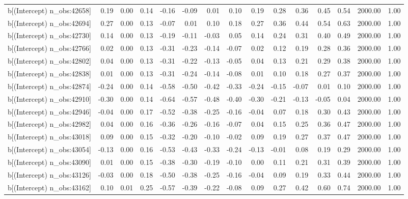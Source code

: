 \begin{table}[ht]
\begin{tabular}{rrrrrrrrrrrrrrr}
  b[(Intercept) n\_obs:42658] & 0.19 & 0.00 & 0.14 & -0.16 & -0.09 & 0.01 & 0.10 & 0.19 & 0.28 & 0.36 & 0.45 & 0.54 & 2000.00 & 1.00 \\ 
  b[(Intercept) n\_obs:42694] & 0.27 & 0.00 & 0.13 & -0.07 & 0.01 & 0.10 & 0.18 & 0.27 & 0.36 & 0.44 & 0.54 & 0.63 & 2000.00 & 1.00 \\ 
  b[(Intercept) n\_obs:42730] & 0.14 & 0.00 & 0.13 & -0.19 & -0.11 & -0.03 & 0.05 & 0.14 & 0.24 & 0.31 & 0.40 & 0.49 & 2000.00 & 1.00 \\ 
  b[(Intercept) n\_obs:42766] & 0.02 & 0.00 & 0.13 & -0.31 & -0.23 & -0.14 & -0.07 & 0.02 & 0.12 & 0.19 & 0.28 & 0.36 & 2000.00 & 1.00 \\ 
  b[(Intercept) n\_obs:42802] & 0.04 & 0.00 & 0.13 & -0.31 & -0.22 & -0.13 & -0.05 & 0.04 & 0.13 & 0.21 & 0.29 & 0.38 & 2000.00 & 1.00 \\ 
  b[(Intercept) n\_obs:42838] & 0.01 & 0.00 & 0.13 & -0.31 & -0.24 & -0.14 & -0.08 & 0.01 & 0.10 & 0.18 & 0.27 & 0.37 & 2000.00 & 1.00 \\ 
  b[(Intercept) n\_obs:42874] & -0.24 & 0.00 & 0.14 & -0.58 & -0.50 & -0.42 & -0.33 & -0.24 & -0.15 & -0.07 & 0.01 & 0.10 & 2000.00 & 1.00 \\ 
  b[(Intercept) n\_obs:42910] & -0.30 & 0.00 & 0.14 & -0.64 & -0.57 & -0.48 & -0.40 & -0.30 & -0.21 & -0.13 & -0.05 & 0.04 & 2000.00 & 1.00 \\ 
  b[(Intercept) n\_obs:42946] & -0.04 & 0.00 & 0.17 & -0.52 & -0.38 & -0.25 & -0.16 & -0.04 & 0.07 & 0.18 & 0.30 & 0.43 & 2000.00 & 1.00 \\ 
  b[(Intercept) n\_obs:42982] & 0.04 & 0.00 & 0.16 & -0.36 & -0.26 & -0.16 & -0.07 & 0.04 & 0.15 & 0.25 & 0.36 & 0.47 & 2000.00 & 1.00 \\ 
  b[(Intercept) n\_obs:43018] & 0.09 & 0.00 & 0.15 & -0.32 & -0.20 & -0.10 & -0.02 & 0.09 & 0.19 & 0.27 & 0.37 & 0.47 & 2000.00 & 1.00 \\ 
  b[(Intercept) n\_obs:43054] & -0.13 & 0.00 & 0.16 & -0.53 & -0.43 & -0.33 & -0.24 & -0.13 & -0.01 & 0.08 & 0.19 & 0.29 & 2000.00 & 1.00 \\ 
  b[(Intercept) n\_obs:43090] & 0.01 & 0.00 & 0.15 & -0.38 & -0.30 & -0.19 & -0.10 & 0.00 & 0.11 & 0.21 & 0.31 & 0.39 & 2000.00 & 1.00 \\ 
  b[(Intercept) n\_obs:43126] & -0.03 & 0.00 & 0.18 & -0.50 & -0.38 & -0.25 & -0.16 & -0.04 & 0.09 & 0.19 & 0.33 & 0.44 & 2000.00 & 1.00 \\ 
  b[(Intercept) n\_obs:43162] & 0.10 & 0.01 & 0.25 & -0.57 & -0.39 & -0.22 & -0.08 & 0.09 & 0.27 & 0.42 & 0.60 & 0.74 & 2000.00 & 1.00 \\ 

\end{tabular}
\end{table}
